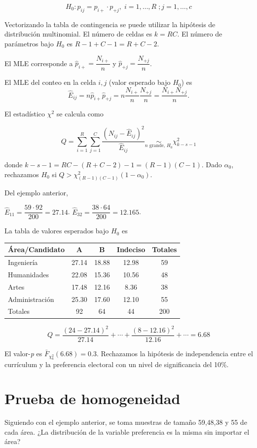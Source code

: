 \documentclass[
  12pt,
]{book}
\begin{document}
\[H_0: p_{ij} = p_{i+}\cdot p_{+j},\;i=1,\dots,R \; ;j=1,\dots, c\]

Vectorizando la tabla de contingencia se puede utilizar la hipótesis de distribución multinomial. El número de celdas es \(k=RC\). El número de parámetros bajo \(H_0\) es \(R-1+C-1 = R+C-2\).

El MLE corresponde a \(\hat p_{i+} = \dfrac{N_{i+}}{n}\) y \(\hat p_{+j} = \dfrac{N_{+j}}{n}\).

El MLE del conteo en la celda \(i,j\) (valor esperado bajo \(H_0\)) es
\[\hat E_{ij} = n\hat p_{i+} \hat p_{+j}  = n\dfrac{N_{i+}}{n}\dfrac{N_{+j}}{n} = \dfrac{N_{i+}N_{+j}}{n}.\]

El estadístico \(\chi^2\) se calcula como

\[Q = \sum_{i=1}^R\sum_{j=1}^C \dfrac{(N_{ij}-\hat E_{ij})^2}{\hat E_{ij}} \underset{n\text{ grande, }H_0}{\sim} \chi^2_{k-s-1}\]

donde \(k-s-1 = RC-(R+C-2)-1 = (R-1)(C-1).\) Dado \(\alpha_0\), rechazamos \(H_0\) si \(Q>\chi^2_{(R-1)(C-1)}(1-\alpha_0)\).

Del ejemplo anterior,

\(\hat E_{11} = \dfrac{59\cdot92}{200} = 27.14\).
\(\hat E_{32} = \dfrac{38\cdot64}{200} = 12.165\).

La tabla de valores esperados bajo \(H_0\) es

\begin{longtable}[]{@{}lcccc@{}}
\toprule
Área/Candidato & A & B & Indeciso & Totales\tabularnewline
\midrule
\endhead
Ingeniería & 27.14 & 18.88 & 12.98 & 59\tabularnewline
Humanidades & 22.08 & 15.36 & 10.56 & 48\tabularnewline
Artes & 17.48 & 12.16 & 8.36 & 38\tabularnewline
Administración & 25.30 & 17.60 & 12.10 & 55\tabularnewline
Totales & 92 & 64 & 44 & 200\tabularnewline
\bottomrule
\end{longtable}

\[Q = \dfrac{(24-27.14)^2}{27.14} + \cdots+\dfrac{(8-12.16)^2}{12.16}+\cdots = 6.68\]

El valor-\emph{p} es \(\bar F_{\chi^2_6}(6.68) = 0.3\). Rechazamos la hipótesis de independencia entre el currículum y la preferencia electoral con un nivel de significancia del 10\%.

\hypertarget{prueba-de-homogeneidad}{%
\section{Prueba de homogeneidad}\label{prueba-de-homogeneidad}}

Siguiendo con el ejemplo anterior, se toma muestras de tamaño 59,48,38 y 55 de cada área. ¿La distribución de la variable preferencia es la misma sin importar el área?
\end{document}
